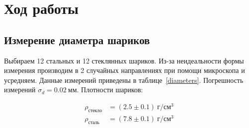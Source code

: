 \documentclass[a4paper, 12pt]{article}
\begin{document}
    \section{Ход работы}
    \subsection{Измерение диаметра шариков}

    Выбираем 12 стальных и 12 стеклянных шариков. Из-за неидеальности формы измерения производим в 2 случайных направлениях при помощи микроскопа и усредняем. Данные измерений приведены в таблице~\ref{diameters}. Погрешность измерений $\sigma_d = 0.02~мм$. Плотности шариков:

    \begin{align*}
        \rho_{стекло}&=(2.5 \pm 0.1)~г/см^3\\
        \rho_{сталь}&=(7.8 \pm 0.1)~г/см^3
    \end{align*}
\end{document}
